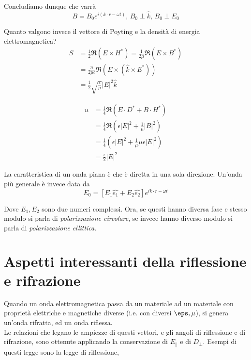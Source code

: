\documentclass{report}
\begin{document}
Concludiamo dunque che varrà 
\begin{equation}
    B = B_0 e^{i(k\cdot r - \omega t)}, \, B_0 \perp \hat{k}, \, B_0 \perp E_0
\end{equation}

Quanto valgono invece il vettore di Poyting e la densità di energia elettromagnetica?
\begin{align}
    S &= \frac{1}{2}\Re{(E \times H^{*})} = \frac{1}{2\mu}\Re{(E \times B^{*})} \\
    &= \frac{n}{2\mu c}\Re{(E \times (\hat{k} \times E^{*}))} \\
    &= \frac{1}{2}\sqrt{\frac{\epsilon}{\mu}}|E|^2 \hat{k}
\end{align}

\begin{align}
    u &= \frac{1}{4}\Re{(E\cdot D^{*}+ B\cdot H^{*})} \\
    &= \frac{1}{4}\Re{(\epsilon|E|^2 + \frac{1}{\mu}|B|^2)} \\
    &= \frac{1}{4}(\epsilon|E|^2 + \frac{1}{\mu}\mu\epsilon|E|^2) \\
    &= \frac{\epsilon}{2}|E|^2
\end{align}


La caratteristica di un onda piana è che è diretta in una sola direzione. Un'onda più generale è invece data da
\begin{equation}
    E_0 = [E_1 \hat{e_1} + E_2 \hat{e_2}]e^{ik\cdot r - \omega t}
\end{equation}

Dove $E_1, E_2 $ sono due numeri complessi. Ora, se questi hanno diversa fase e stesso modulo si parla di \emph{polarizzazione circolare}, se invece hanno diverso modulo si parla di \emph{polarizzazione ellittica}. 

\section{Aspetti interessanti della riflessione e rifrazione}

Quando un onda elettromagnetica passa da un materiale ad un materiale con proprietà elettriche e magnetiche diverse (i.e. con diversi \(\eps, \mu\)), si genera un'onda rifratta, ed un onda riflessa. \\

Le relazioni che legano le ampiezze di questi vettori, e gli angoli di riflessione e di rifrazione, sono ottenute applicando la conservazione di \(E_{\parallel}\) e di \(D_{\perp}\). Esempi di questi legge sono la legge di riflessione, 
\end{document}
